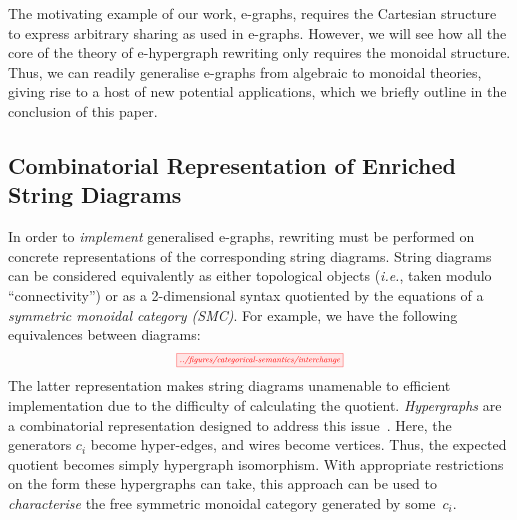 The motivating example of our work, e-graphs, requires the Cartesian structure to express arbitrary sharing as used in e-graphs.
However, we will see how all the core of the theory of e-hypergraph rewriting only requires the monoidal structure. 
Thus, we can readily generalise e-graphs from algebraic to monoidal theories, giving rise to a  host of new potential applications, which we briefly outline in the conclusion of this paper.   

\subsection{Combinatorial Representation of Enriched String Diagrams}

In order to \textit{implement} generalised e-graphs, rewriting must be performed on concrete representations of the corresponding string diagrams.  
String diagrams can be considered equivalently as either topological objects (\textit{i.e.}, taken modulo ``connectivity'') or as a 2-dimensional syntax quotiented by the equations of a \textit{symmetric monoidal category (SMC)}.
For example, we have the following equivalences between diagrams:
\[
	\scalebox{0.6}{
	\tikzfig{../figures/categorical-semantics/interchange}
	}
\]
The latter representation makes string diagrams unamenable to efficient implementation due to the difficulty of calculating the quotient.
\emph{Hypergraphs} are a combinatorial representation designed to address this issue~\cite{bonchi_string_2022-1,bonchi_string_2022-2,bonchi_string_2022-3}.
Here, the generators $c_i$ become hyper-edges,  and wires become vertices.  
Thus, the expected quotient becomes simply hypergraph isomorphism. 
With appropriate restrictions on the form these hypergraphs can take, this approach can be used to \textit{characterise} the free symmetric monoidal category generated by some~$c_i$. 

